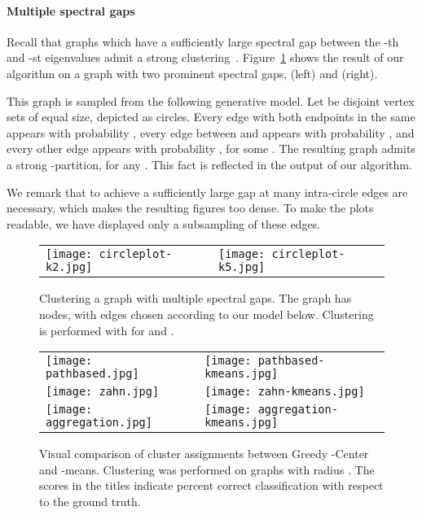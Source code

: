 \documentclass[11pt]{article}
\theoremstyle{plain}
\begin{document}
\paragraph*{Multiple spectral gaps}
Recall that graphs
which have a sufficiently large spectral gap between the -th and -st
eigenvalues admit a strong clustering~\cite{DBLP:conf/soda/GharanT14}.
Figure~\ref{experiment1} shows the result of our algorithm on a graph
with two prominent spectral gaps,  (left) and  (right).

This graph is sampled from the following generative model.
Let  be disjoint vertex sets of equal size, depicted as circles.
Every edge with both endpoints in the same  appears with probability ,
every edge between  and  appears with
probability , and every other edge appears with probability , for
some . The resulting graph admits a strong -partition,
for any . This fact is reflected in the output of our algorithm.

We remark that to achieve a sufficiently large gap at  many intra-circle
edges are necessary, which makes the resulting figures too dense.
To make the plots readable, we have displayed only a subsampling of these edges.

\begin{figure}
\begin{center}
\begin{tabular}{ll}
\texttt{[image: circleplot-k2.jpg]} &
\texttt{[image: circleplot-k5.jpg]}
\end{tabular}
\end{center}
\caption{Clustering a graph with multiple spectral gaps. The graph has 
nodes, with edges chosen according to our model below. Clustering is performed
with  for  and .}
\label{experiment1}
\end{figure}

\begin{figure}
\begin{center}
\begin{tabular}{ll}
\texttt{[image: pathbased.jpg]} &
\texttt{[image: pathbased-kmeans.jpg]} \\
\texttt{[image: zahn.jpg]} &
\texttt{[image: zahn-kmeans.jpg]} \\
\texttt{[image: aggregation.jpg]} &
\texttt{[image: aggregation-kmeans.jpg]} \\
\end{tabular}
\end{center}
\caption{Visual comparison of cluster assignments between Greedy -Center
and -means. Clustering was performed on graphs with radius .
The scores in the titles indicate percent correct classification with respect
to the ground truth.}
\label{experiment2}
\end{figure}
\end{document}
